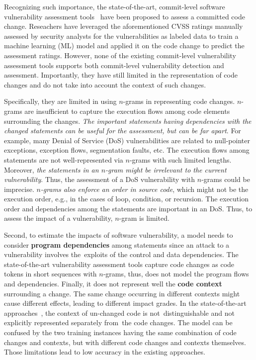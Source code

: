Recognizing such importance, the state-of-the-art, commit-level
software vulnerability assessment tools~\cite{deepCVA-ase21} have been
proposed to assess a committed code change. Reseachers have leveraged
the aforementioned CVSS ratings manually assessed by security analysts
for the vulnerabilities as labeled data to train a machine learning
(ML) model and applied it on the code change to predict the assessment
ratings. However, none of the existing commit-level vulnerability
assessment tools supports both commit-level vulnerability detection
and assessment. Importantly, they have still limited in the
representation of code changes and do not take into account the
context of such changes.

Specifically, they are limited in using $n$-grams in representing code
changes. $n$-grams are insufficient to capture the execution flows
among code elements surrounding the changes. {\em The important
  statements having dependencies with the changed statements can be
  useful for the assessment, but can be far apart}. For example, many
Denial of Service (DoS) vulnerabilities are related to null-pointer
exceptions, exception flows, segmentation faults, etc. The execution
flows among statements are not well-represented via $n$-grams with
such limited lengths. Moreover, {\em the statements in an $n$-gram
  might be irrelevant to the current vulnerability}. Thus, the
assessment of a DoS vulnerability with $n$-grams could be
imprecise. {\em $n$-grams also enforce an order in source code}, which
might not be the execution order, e.g., in the cases of loop,
condition, or recursion. The execution order and dependencies among
the statements are important in an DoS. Thus, to assess the impact of
a vulnerability, $n$-gram is limited.

Second, to estimate the impacts of software vulnerability, a model
needs to consider {\bf program dependencies} among statements since an
attack to a vulnerability involves the~exploits of the control and
data dependencies. The state-of-the-art vulnerability assessment tools
capture code changes as code tokens in short sequences with $n$-grams,
thus, does not model the program flows and dependencies. Finally, it
does not represent well the {\bf code context} surrounding a
change. The same change occurring in different contexts might cause
different effects, leading to different impact grades. In the
state-of-the-art approaches~\cite{deepCVA-ase21}, the context of
un-changed code is not~distinguishable and not explicitly represented
separately from~the code changes. The model can be confused by the two
training instances having the same combination of code changes and
contexts, but with different code changes and contexts
themselves. Those limitations lead to low accuracy in the
existing approaches.

